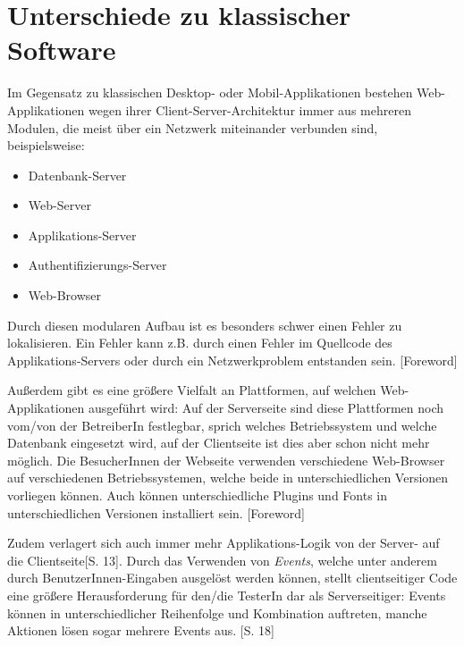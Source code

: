 \documentclass[a4paper,bibtotoc,oneside]{scrbook}
\begin{document}



\chapter{Unterschiede zu klassischer Software}
Im Gegensatz zu klassischen Desktop- oder Mobil-Applikationen bestehen Web-Applikationen wegen ihrer Client-Server-Architektur immer aus mehreren Modulen, die meist über ein Netzwerk miteinander verbunden sind, beispielsweise: 

\begin{itemize}
\item Datenbank-Server
\item Web-Server
\item Applikations-Server
\item Authentifizierungs-Server
\item Web-Browser
\end{itemize}

Durch diesen modularen Aufbau ist es besonders schwer einen Fehler zu lokalisieren. Ein Fehler kann z.B. durch einen Fehler im Quellcode des Applikations-Servers oder durch ein Netzwerkproblem entstanden sein. \cite{testing_apps_on_web}[Foreword]

Außerdem gibt es eine größere Vielfalt an Plattformen, auf welchen Web-Applikationen ausgeführt wird: Auf der Serverseite sind diese Plattformen noch vom/von der BetreiberIn festlegbar, sprich welches Betriebssystem und welche Datenbank eingesetzt wird, auf der Clientseite ist dies aber schon nicht mehr möglich. Die BesucherInnen der Webseite verwenden verschiedene Web-Browser auf verschiedenen Betriebssystemen, welche beide in unterschiedlichen Versionen vorliegen können. Auch können unterschiedliche Plugins und Fonts in unterschiedlichen Versionen installiert sein. \cite{testing_apps_on_web}[Foreword]

Zudem verlagert sich auch immer mehr Applikations-Logik von der Server- auf die Clientseite\cite{testing_apps_on_web}[S. 13]. Durch das Verwenden von \emph{Events}, welche unter anderem durch BenutzerInnen-Eingaben ausgelöst werden können, stellt clientseitiger Code eine größere Herausforderung für den/die TesterIn dar als Serverseitiger: Events können in unterschiedlicher Reihenfolge und Kombination auftreten, manche Aktionen lösen sogar mehrere Events aus. \cite{testing_apps_on_web}[S. 18]
\end{document}

